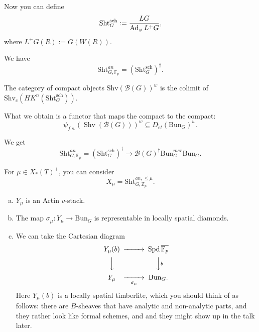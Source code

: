 \documentclass[reqno]{amsart} 
\begin{document}
Now you can define
\begin{equation*}
  \mathrm{Sht}_G^{\mathrm{sch}} :=
  \frac{L G}{\operatorname{Ad}_{\varphi} L^+ G},
\end{equation*}
where $L^+ G(R) := G(W(R))$.

\begin{theorem}[G-Iomar]
  We have
  \begin{equation*}
    \mathrm{Sht}_{G, \mathbb{F}_p}^{an}
    = \left( \mathrm{Sht}_{G}^{\mathrm{sch}} \right)^{\dagger}.
  \end{equation*}
\end{theorem}
\begin{theorem}[Zhu]
  The category of compact objects $\mathrm{Shv}(\mathcal{B}(G))^w$ is the colimit of $\mathrm{Shv}_c(H K^n(\mathrm{Sht}_G^{\mathrm{sch}}))$.
\end{theorem}
What we obtain is a functor that maps the compact to the compact:
\begin{equation*}
  \psi_{f. s.}(\operatorname{Shv}(\mathcal{B}(G)))^w
  \subseteq D_{\acute{e}t}
  \left( \mathrm{Bun}_G \right)^w.
\end{equation*}

We get
\begin{equation*}
  \mathrm{Sht}_{G, \mathbb{F}_p}^{an}
  = \left( \mathrm{Sht}_{G}^{\mathrm{sch}} \right)^{\dagger}
  \rightarrow \mathcal{B}(G)^{\dagger}
  \mathrm{Bun}_G^{mer}
  \mathrm{Bun}_G.
\end{equation*}
\begin{theorem}[G]
  For $\mu \in X_\ast(T)^+$, you can consider
  \begin{equation*}
    X_\mu = \mathrm{Sht}_{G, \mathbb{Z}_p}^{an, \leq \mu}.
  \end{equation*}
  \begin{enumerate}[(a)]
  \item\label{enumerate:cnppk4f159} $Y_\mu$ is an Artin $v$-stack.
  \item\label{enumerate:cnppk4f247} The map $\sigma_\mu : Y_\mu \rightarrow \mathrm{Bun}_G$ is representable in locally spatial diamonds.
  \item\label{enumerate:cnppk4hjug} We can take the Cartesian diagram
    \begin{equation*}
      \begin{CD}         
        Y_\mu(b) @>>> \operatorname{Spd} \overline{\mathbb{F}_p}\\
        @VVV  @VVbV \\
        Y_\mu @>> \sigma_\mu> \mathrm{Bun}_G.\\
      \end{CD}
    \end{equation*}
    Here $Y_\mu(b)$ is a locally spatial timberlite, which you should think of as follows: there are $B$-sheaves that have analytic and non-analytic parts, and they rather look like formal schemes, and and they might show up in the talk later.
  \end{enumerate}
\end{theorem}
\end{document}
